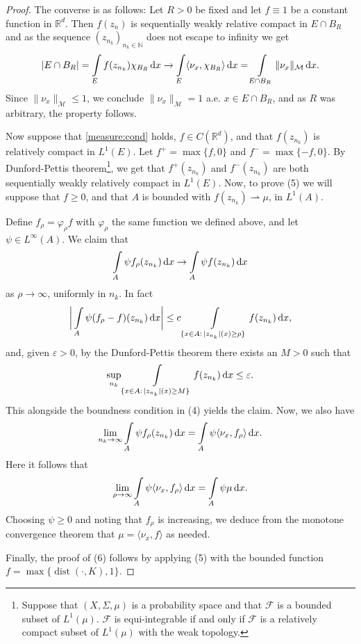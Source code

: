 \documentclass[a4paper,doc,11pt]{article}
\newcommand{\R}{\mathbb{R}}
\newcommand{\N}{\mathbb{N}}
\DeclareMathOperator{\dist}{dist}
\begin{document}
\begin{proof}
    The converse is as follows: Let \(R>0\) be fixed and let \(f\equiv 1\) be a constant function in \(\R^d\). Then \(f(z_{n})\) is sequentially weakly relative compact in \(E \cap B_R\) and as the sequence \((z_{n_k})_{n_k\in \N}\) does not escape to infinity we get
    \[
        |E\cap B_R| = \int\limits_E f(z_{n_k}) \chi_{B_R} \dif x
        \to
        \int\limits_E \langle \nu_x, \chi_{B_R}\rangle \dif x
        =
        \int\limits_{E\cap B_R} \|\nu_x\|_{\mathcal{M}}  \dif x.
    \]
    Since \(\|\nu_x\|_{\mathcal{M}} \leq 1\), we conclude \( \|\nu_x\|_{\mathcal{M}} = 1\) a.e. \(x \in E\cap B_R\), and as \(R\) was arbitrary, the property follows.
            
    
    Now suppose that \eqref{measure:cond} holds, \(f \in C(\R^d)\), and that
    \(
        f(z_{n_k}) 
    \)
     is relatively compact in  \(L^1(E)\). Let \( f^+ = \max\{f,0\}\) and \( f^- = \max\{-f,0\}\). By Dunford-Pettis theorem\footnote{Suppose that \((X,\Sigma,\mu)\) is a probability space and that \(\mathcal{F}\) is a bounded subset of \(L^1(\mu)\). \(\mathcal{F}\) is equi-integrable if and only if \(\mathcal{F}\) is a relatively compact subset of \(L^1(\mu)\) with the weak topology.}, we get that \(f^+(z_{n_k})\) and \(f^-(z_{n_k})\) are both sequentially weakly relatively compact in \(L^1(E)\). Now, to prove (5) we will suppose that \(f\geq 0\), and that \(A\) is bounded with \( f(z_{n_k}) \rightharpoonup \mu\), in \(L^1(A)\). 
     
     Define \(f_\rho = \varphi_\rho f\) with \(\varphi_\rho\) the same function we defined above, and let \(\psi \in L^\infty (A)\). We claim that 
     \[
        \int\limits_A \psi f_\rho (z_{n_k}) \dif x
        \to
        \int\limits_A \psi f (z_{n_k}) \dif x
     \]
     as \(\rho \to \infty\), uniformly in \(n_k\). In fact
     \[
        \bigg|
        \int\limits_A \psi ( f_\rho - f) (z_{n_k}) \dif x
        \bigg|
        \leq c 
        \int\limits_{ \{x\in A: \, |z_{n_k}|(x) \geq \rho \} }  f (z_{n_k}) \dif x,
     \]
     and, given \(\varepsilon>0\), by the Dunford-Pettis theorem there exists an \(M>0\) such that
     \[
        \sup_{n_k} \int\limits_{ \{x\in A: \, |z_{n_k}|(x) \geq M \} }  f (z_{n_k}) \dif x \leq \varepsilon.
     \]
     This alongside the boundness condition in (4) yields the claim. Now, we also have
     \[
        \lim_{n_k \to \infty} \int\limits_A \psi f_\rho(z_{n_k}) \dif x
        = \int\limits_A \psi \langle \nu_x, f_\rho \rangle \dif x.
     \]
     Here it follows that
     \[
        \lim_{\rho \to \infty} \int\limits_A \psi \langle \nu_x, f_\rho \rangle \dif x
        = \int\limits_A \psi \mu \dif x.
     \]
     Choosing \(\psi \geq 0\) and noting that \( f_\rho\) is increasing,  we deduce from the monotone convergence theorem that \( \mu = \langle \nu_x, f\rangle\) as needed.
    
    Finally, the proof of (6) follows by applying (5) with the bounded function \(f = \max\{\dist(\cdot, K),1\}\).
\end{proof}
\end{document}
